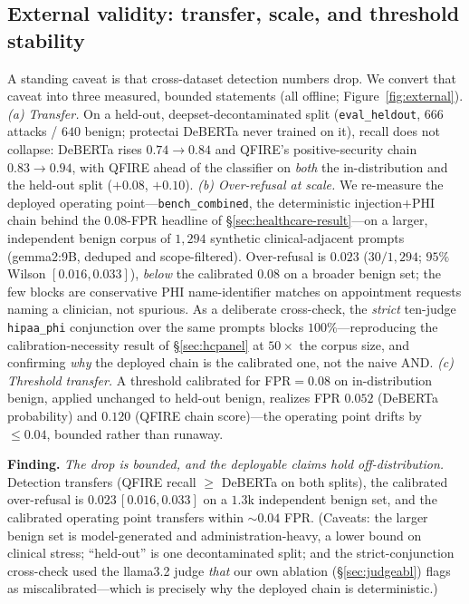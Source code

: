 \documentclass[11pt]{article}
\begin{document}
\subsection{External validity: transfer, scale, and threshold stability}\label{sec:external}
A standing caveat is that cross-dataset detection numbers drop. We convert that
caveat into three measured, bounded statements (all offline; Figure~\ref{fig:external}).
\emph{(a) Transfer.} On a held-out, deepset-decontaminated split
(\texttt{eval\_heldout}, $666$ attacks / $640$ benign; protectai DeBERTa never trained
on it), recall does not collapse: DeBERTa rises $0.74\rightarrow0.84$ and QFIRE's
positive-security chain $0.83\rightarrow0.94$, with QFIRE ahead of the classifier on
\emph{both} the in-distribution and the held-out split ($+0.08$, $+0.10$). \emph{(b)
Over-refusal at scale.} We re-measure the deployed operating point---\texttt{bench\_combined},
the deterministic injection$+$PHI chain behind the $0.08$-FPR headline of
\S\ref{sec:healthcare-result}---on a larger, independent benign corpus of $1{,}294$
synthetic clinical-adjacent prompts (gemma2:9B, deduped and scope-filtered).
Over-refusal is $\mathbf{0.023}$ ($30/1{,}294$; $95\%$ Wilson
$[0.016,0.033]$), \emph{below} the calibrated $0.08$ on a broader benign set; the few
blocks are conservative PHI name-identifier matches on appointment requests naming a
clinician, not spurious. As a deliberate cross-check, the \emph{strict} ten-judge
\texttt{hipaa\_phi} conjunction over the same prompts blocks $100\%$---reproducing the
calibration-necessity result of \S\ref{sec:hcpanel} at $50\times$ the corpus
size, and confirming \emph{why} the deployed chain is the calibrated one, not the naive
AND. \emph{(c) Threshold transfer.} A threshold calibrated for FPR$=0.08$ on
in-distribution benign, applied unchanged to held-out benign, realizes FPR $0.052$
(DeBERTa probability) and $0.120$ (QFIRE chain score)---the operating point drifts by
$\le 0.04$, bounded rather than runaway.

\medskip\noindent\textbf{Finding.} \emph{The drop is bounded, and the deployable claims hold
off-distribution.} Detection transfers (QFIRE recall $\ge$ DeBERTa on both splits),
the calibrated over-refusal is $0.023\,[0.016,0.033]$ on a $1.3$k independent benign
set, and the calibrated operating point transfers within $\sim\!0.04$ FPR. (Caveats:
the larger benign set is model-generated and administration-heavy, a lower bound on
clinical stress; ``held-out'' is one decontaminated split; and the strict-conjunction
cross-check used the llama3.2 judge \emph{that} our own ablation (\S\ref{sec:judgeabl})
flags as miscalibrated---which is precisely why the deployed chain is deterministic.)
\end{document}

